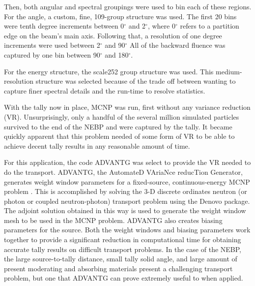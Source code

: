 Then, both angular and spectral groupings were used to bin each of these regions.
For the angle, a custom, fine, 109-group structure was used.
The first 20 bins were tenth degree increments between 0$^{\circ}$ and 2$^{\circ}$, where 0$^{\circ}$ refers to a partition edge on the beam's main axis.
Following that, a resolution of one degree increments were used between 2$^{\circ}$ and 90$^{\circ}$
All of the backward fluence was captured by one bin between 90$^{\circ}$ and 180$^{\circ}$.

For the energy structure, the scale252 group structure was used.
This medium-resolution structure was selected because of the trade off between wanting to capture finer spectral details and the run-time to resolve statistics.

With the tally now in place, MCNP was run, first without any variance reduction (VR).
Unsurprisingly, only a handful of the several million simulated particles survived to the end of the NEBP and were captured by the tally.
It became quickly apparent that this problem needed of some form of VR to be able to achieve decent tally results in any reasonable amount of time.

For this application, the code ADVANTG was select to provide the VR needed to do the transport.
ADVANTG, the AutomateD VAriaNce reducTion Generator, generates weight window parameters for a fixed-source, continuous-energy MCNP problem \cite{mosher2013advantg}.
This is accomplished by solving the 3-D discrete ordinates neutron (or photon or coupled neutron-photon) transport problem using the Denovo package.
The adjoint solution obtained in this way is used to generate the weight window mesh to be used in the MCNP problem.
ADVANTG also creates biasing parameters for the source.
Both the weight windows and biasing parameters work together to provide a significant reduction in computational time for obtaining accurate tally results on difficult transport problems.
In the case of the NEBP, the large source-to-tally distance, small tally solid angle, and large amount of present moderating and absorbing materials present a challenging transport problem, but one that ADVANTG can prove extremely useful to when applied.

